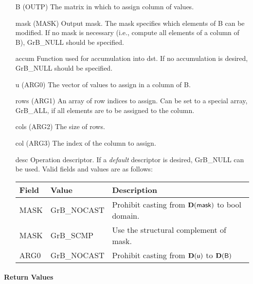 \begin{itemize}[leftmargin=1.1in]
    \item[{\sf B}]   ({\sf OUTP}) The matrix in which to assign column of values.

    \item[{\sf mask}] ({\sf MASK}) Output mask. The mask specifies which elements
    of {\sf B} can be modified. If no mask is necessary (i.e., compute all
    elements of a column of {\sf B}), {\sf GrB\_NULL} should be specified.

    \item[{\sf accum}] Function used for accumulation into {\sf dst}.  If no accumulation
                        is desired, {\sf GrB\_NULL} should be specified.

    \item[{\sf u}]   ({\sf ARG0}) The vector of values to assign in a column of {\sf B}.

    \item[{\sf rows}]     ({\sf ARG1}) An array of row indices to assign. Can
                              be set to a special array, {\sf GrB\_ALL}, if all elements
                              are to be assigned to the column.
    \item[{\sf cols}]    ({\sf ARG2}) The size of {\sf rows}.
    \item[{\sf col}]     ({\sf ARG3}) The index of the column to assign.

    \item[{\sf desc}]   Operation descriptor. If a
    \emph{default} descriptor is desired, {\sf GrB\_NULL} can be
    used. Valid fields and values are as follows: \\
    \begin{tabular}{lll}
    Field  & Value & Description \\
    \hline
    {\sf MASK} & {\sf GrB\_NOCAST} & Prohibit casting from $\bold{D}({\sf mask})$ to {\sf bool} domain. \\
    {\sf MASK} & {\sf GrB\_SCMP} & Use the structural complement of {\sf mask}. \\
    {\sf ARG0} & {\sf GrB\_NOCAST} & Prohibit casting from $\bold{D}({\sf u})$ to $\bold{D}({\sf B})$ \\
    \end{tabular}

\end{itemize}

\paragraph{Return Values}

